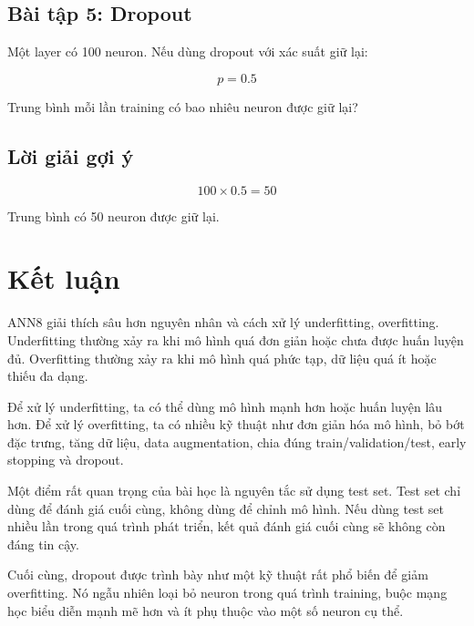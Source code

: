\subsection*{Bài tập 5: Dropout}

Một layer có 100 neuron. Nếu dùng dropout với xác suất giữ lại:

\[
    p=0.5
\]

Trung bình mỗi lần training có bao nhiêu neuron được giữ lại?

\subsection*{Lời giải gợi ý}

\[
    100 \times 0.5 = 50
\]

Trung bình có 50 neuron được giữ lại.

\section*{Kết luận}

ANN8 giải thích sâu hơn nguyên nhân và cách xử lý underfitting, overfitting. Underfitting thường xảy ra khi mô hình quá đơn giản hoặc chưa được huấn luyện đủ. Overfitting thường xảy ra khi mô hình quá phức tạp, dữ liệu quá ít hoặc thiếu đa dạng.

Để xử lý underfitting, ta có thể dùng mô hình mạnh hơn hoặc huấn luyện lâu hơn. Để xử lý overfitting, ta có nhiều kỹ thuật như đơn giản hóa mô hình, bỏ bớt đặc trưng, tăng dữ liệu, data augmentation, chia đúng train/validation/test, early stopping và dropout.

Một điểm rất quan trọng của bài học là nguyên tắc sử dụng test set. Test set chỉ dùng để đánh giá cuối cùng, không dùng để chỉnh mô hình. Nếu dùng test set nhiều lần trong quá trình phát triển, kết quả đánh giá cuối cùng sẽ không còn đáng tin cậy.

Cuối cùng, dropout được trình bày như một kỹ thuật rất phổ biến để giảm overfitting. Nó ngẫu nhiên loại bỏ neuron trong quá trình training, buộc mạng học biểu diễn mạnh mẽ hơn và ít phụ thuộc vào một số neuron cụ thể.

